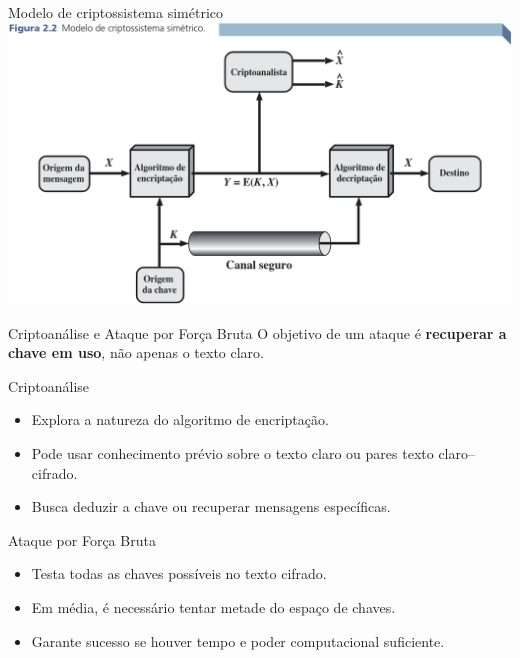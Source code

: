 \begin{frame}{Modelo de criptossistema simétrico}
    \centering
    \includegraphics[width=0.9\linewidth]{Figuras/modelo-cripto-simetrico-2.png}


\end{frame}

\begin{frame}{Criptoanálise e Ataque por Força Bruta}
    O objetivo de um ataque é \textbf{recuperar a chave em uso}, não apenas o texto claro.

    \begin{block}{Criptoanálise}
        \begin{itemize}
            \item Explora a natureza do algoritmo de encriptação.
            \item Pode usar conhecimento prévio sobre o texto claro ou pares texto claro–cifrado.
            \item Busca deduzir a chave ou recuperar mensagens específicas.
        \end{itemize}
    \end{block}

    \begin{block}{Ataque por Força Bruta}
        \begin{itemize}
            \item Testa todas as chaves possíveis no texto cifrado.
            \item Em média, é necessário tentar metade do espaço de chaves.
            \item Garante sucesso se houver tempo e poder computacional suficiente.
        \end{itemize}
    \end{block}
\end{frame}

